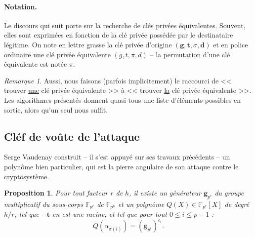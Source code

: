\documentclass[a4paper, titlepage, 11pt]{article}
\newtheorem{prop}[theo]{Proposition}
\theoremstyle{definition}
\theoremstyle{remark}
\newtheorem{rema}[theo]{Remarque}
\def\gf #1{\mathbb{F}_{#1}}
\def\mbf #1{\mathbf{#1}}
\begin{document}
\paragraph{Notation.} Le discours qui suit porte sur la recherche de clés privées équivalentes. Souvent, elles sont exprimées en fonction de la clé privée possédée par le destinataire légitime. On note en lettre grasse la clé privée d'origine $(\mbf{g}, \mbf{t}, \sigma, \mbf{d})$ et en police ordinaire une clé privée équivalente $(g, t, \pi, d)$ -- la permutation d'une clé équivalente est notée $\pi$.

\begin{rema}
Aussi, nous faisons (parfois implicitement) le raccourci de << trouver \underline{une} clé privée équivalente >> à << trouver \underline{la} clé privée équivalente >>. Les algorithmes présentés donnent quasi-tous une liste d'éléments possibles en sortie, alors qu'un seul nous suffit.
\end{rema}

\subsection{Cléf de voûte de l'attaque}

Serge Vaudenay construit -- il s'est appuyé sur ses travaux précédents -- un polynôme bien particulier, qui est la pierre angulaire de son attaque contre le cryptosystème.

\begin{prop}\label{prop:vaudenay}
Pour tout facteur $r$ de $h$, il existe un générateur $\mbf g_{p^r}$ du groupe multiplicatif du sous-corps $\gf{p^r}$ de $\gf{p^h}$ et un polynôme $Q(X) \in \gf{p^r}[X]$ de degré $h/r$, tel que $-\mbf t$ en est une racine, et tel que pour tout $0\leqslant i \leqslant p-1$ :
$$Q\left(\alpha_{\sigma(i)}\right) = (\mbf g_{p^r})^{c_i}.$$
\end{prop}
\end{document}
